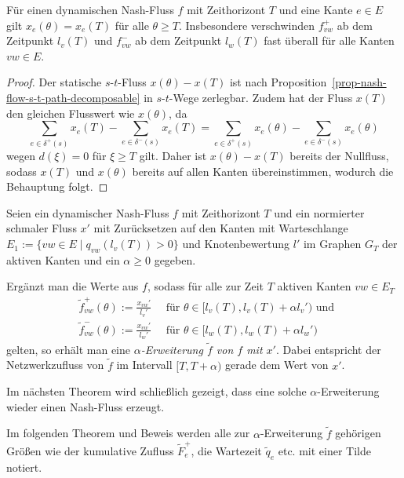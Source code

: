 \begin{proposition}
	Für einen dynamischen Nash-Fluss $f$ mit Zeithorizont $T$ und eine Kante $e\in E$ gilt $x_{e}(\theta) = x_{e}(T)$ für alle $\theta \geq T$.
	Insbesondere verschwinden $f_{vw}^+$ ab dem Zeitpunkt $l_v(T)$ und $f_{vw}^-$ ab dem Zeitpunkt $l_w(T)$ fast überall für alle Kanten $vw\in E$.
\end{proposition}
\begin{proof}
	Der statische $s$-$t$-Fluss $x(\theta) -x(T)$ ist nach Proposition~\ref{prop-nash-flow-s-t-path-decomposable} in $s$-$t$-Wege zerlegbar.
	Zudem hat der Fluss $x(T)$ den gleichen Flusswert wie $x(\theta)$, da
	\[ \sum_{e\in \delta^+(s)} x_e(T) - \sum_{e\in\delta^-(s)} x_e(T) = \sum_{e\in \delta^+(s)} x_e(\theta) - \sum_{e\in\delta^-(s)} x_e(\theta)\]
	wegen $d(\xi) = 0$ für $\xi \geq T $ gilt.
	Daher ist $x(\theta)- x(T)$ bereits der Nullfluss, sodass $x(T)$ und $x(\theta)$ bereits auf allen Kanten übereinstimmen, wodurch die Behauptung folgt.
\end{proof}

\begin{definition}
	Seien ein dynamischer Nash-Fluss $f$ mit Zeithorizont $T$ und ein normierter schmaler Fluss $x'$ mit Zurücksetzen auf den Kanten mit Warteschlange $E_1 := \{ vw\in E \mid q_{vw}(l_v(T)) > 0 \} $ und Knotenbewertung $l'$ im Graphen $G_T$ der aktiven Kanten und ein $\alpha \geq 0$ gegeben.
	
	Ergänzt man die Werte aus $f$, sodass für alle zur Zeit $T$ aktiven Kanten $vw\in E_T$
	\begin{align*}
	&\tilde{f}_{vw}^+(\theta):= \frac{x_{vw}'}{l_v'} \text{~~~ für $\theta\in [l_v(T), l_v(T)+\alpha l_v')$ und } \\ &\tilde{f}_{vw}^-(\theta):=\frac{x_{vw}'}{l_w'} \text{~~~ für $\theta\in [l_w(T), l_w(T)+\alpha l_w')$}
	\end{align*}
	gelten, so erhält man eine \emph{$\alpha$-Erweiterung $\tilde{f}$ von $f$ mit $x'$}.
	Dabei entspricht der Netzwerkzufluss von $\tilde{f}$ im Intervall $[T, T+\alpha)$ gerade dem Wert von $x'$.
\end{definition}

Im nächsten Theorem wird schließlich gezeigt, dass eine solche $\alpha$-Erweiterung wieder einen Nash-Fluss erzeugt.

\begin{notation}
	Im folgenden Theorem und Beweis werden alle zur $\alpha$-Erweiterung $\tilde{f}$ gehörigen Größen wie der kumulative Zufluss $\tilde{F}_e^+$, die Wartezeit $\tilde{q}_e$ etc. mit einer Tilde notiert.
\end{notation}

